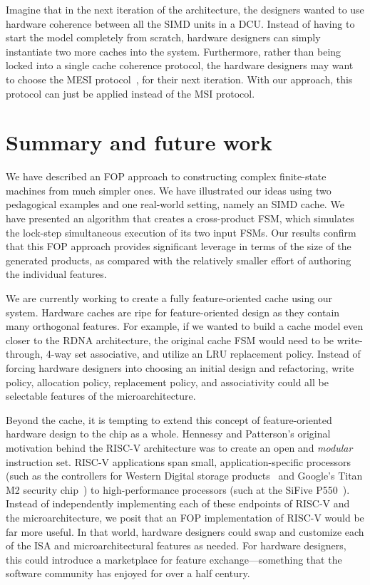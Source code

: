 \documentclass[conference]{IEEEtran}
\begin{document}
Imagine that in the next iteration of the architecture, the designers wanted to use hardware coherence between all the SIMD units in a DCU. Instead of having to start the model completely from scratch, hardware designers can simply instantiate two more caches into the system. Furthermore, rather than being locked into a single cache coherence protocol, the hardware designers may want to choose the MESI protocol~\cite{Papamarcos:84}, for their next iteration. With our approach, this protocol can just be applied instead of the MSI protocol. 

\section{Summary and future work}

We have described an FOP approach to constructing complex finite-state machines from much simpler ones.   We have illustrated our ideas using two pedagogical examples and one real-world setting, namely an SIMD cache.   We have presented an algorithm that creates a cross-product FSM, which simulates the lock-step simultaneous execution of its two input FSMs.  Our results confirm that this FOP approach provides significant leverage in terms of the size of the generated products, as compared with the relatively smaller effort of authoring the individual features.

We are currently working to create a fully feature-oriented cache using our system. Hardware caches are ripe for feature-oriented design as they contain many orthogonal features. For example, if we wanted to build a cache model even closer to the RDNA architecture, the original cache FSM would need to be write-through, 4-way set associative, and utilize an LRU replacement policy. Instead of forcing hardware designers into choosing an initial design and refactoring, write policy, allocation policy, replacement policy, and associativity could all be selectable features of the microarchitecture.

Beyond the cache, it is tempting to extend this concept of feature-oriented hardware design to the chip as a whole. Hennessy and Patterson's original motivation behind the RISC-V architecture was to create an open and \emph{modular} instruction set. RISC-V applications span small, application-specific processors (such as the controllers for Western Digital storage products~\cite{WD:22} and Google's Titan M2 security chip~\cite{kleidermacher:21}) to high-performance processors (such at the SiFive P550~\cite{SiFive:22}). Instead of independently implementing each of these endpoints of RISC-V and the microarchitecture, we posit that an FOP implementation of RISC-V would be far more useful. In that world, hardware designers could swap and customize each of the ISA and microarchitectural features as needed.  For hardware designers, this could introduce a marketplace for feature exchange---something that the software community has enjoyed for over a half century.



\end{document}
